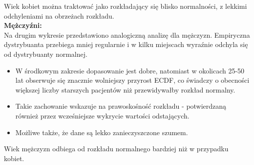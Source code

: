 \documentclass{mwart}
\begin{document}
	Wiek kobiet można traktować jako rozkładający się blisko normalności, z lekkimi odchyleniami na obrzeżach rozkładu. \\
	\textbf{Mężczyźni:} \\
	Na drugim wykresie przedstawiono analogiczną analizę dla mężczyzn. Empiryczna dystrybuanta przebiega mniej regularnie i w kilku miejscach wyraźnie odchyla się od dystrybuanty normalnej.
	\begin{itemize}
		\item W środkowym zakresie dopasowanie jest dobre, natomiast w okolicach 25-50 lat obserwuje się znacznie wolniejszy przyrost ECDF, co świadczy o obecności większej liczby starszych pacjentów niż przewidywałby rozkład normalny.
		\item Takie zachowanie wskazuje na prawoskośność rozkładu - potwierdzaną również przez wcześniejsze wykrycie wartości odstających.
		\item Możliwe także, że dane są lekko zanieczyszczone szumem.
	\end{itemize}
	Wiek mężczyzn odbiega od rozkładu normalnego bardziej niż w przypadku kobiet.
\end{document}
